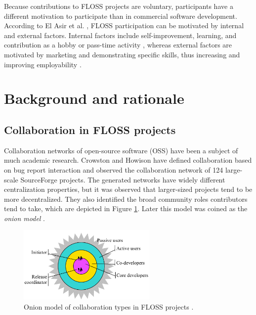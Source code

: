 Because contributions to FLOSS projects are voluntary, participants have a different motivation to participate than in commercial software development. According to El Asir et al. \cite{elasriPeripheryCoreTemporal2017}, FLOSS participation can be motivated by internal and external factors. Internal factors include self-improvement, learning, and contribution as a hobby or pass-time activity  \cite{alexanderharsWorkingFreeMotivations2002,yunwenyeUnderstandingMotivationOpen2003}, whereas external factors are motivated by marketing and demonstrating specific skills, thus increasing and improving employability \cite{alexanderharsWorkingFreeMotivations2002}.

\section{Background and rationale}

\subsection{Collaboration in FLOSS projects}
Collaboration networks of open-source software (OSS) have been a subject of much academic research. Crowston and Howison \cite{crowstonSocialStructureFree2005} have defined collaboration based on bug report interaction and observed the collaboration network of 124 large-scale SourceForge projects. The generated networks have widely different centralization properties, but it was observed that larger-sized projects tend to be more decentralized. They also identified the broad community roles contributors tend to take, which are depicted in Figure \ref{fig:onion1}. Later this model was coined as the \textit{onion model} \cite{martinez-romoUsingSocialNetwork2008}.

\begin{figure}[!htbp]
    \centering
    \includegraphics[width=0.6\textwidth]{figures/onion_model.png}
    \caption{Onion model of collaboration types in FLOSS projects \cite{crowstonSocialStructureFree2005}.}
    \label{fig:onion1}
\end{figure}


